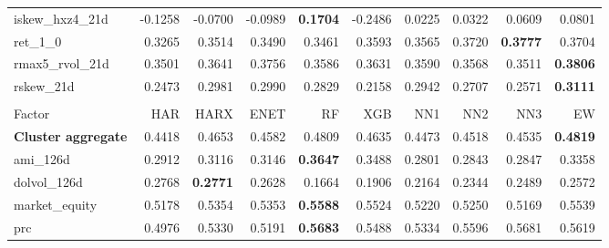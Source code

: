 \begin{longtable}{>{\raggedright\arraybackslash}p{2.6cm}rrrrrrrrr}
iskew\_hxz4\_21d & -0.1258 & \cellcolor{blue!10}-0.0700 & \cellcolor{blue!10}-0.0989 & \textbf{\cellcolor{blue!10}0.1704} & -0.2486 & \cellcolor{blue!10}0.0225 & \cellcolor{blue!10}0.0322 & \cellcolor{blue!10}0.0609 & \cellcolor{blue!10}0.0801 \\
ret\_1\_0 & 0.3265 & \cellcolor{blue!10}0.3514 & \cellcolor{blue!10}0.3490 & \cellcolor{blue!10}0.3461 & \cellcolor{blue!10}0.3593 & \cellcolor{blue!10}0.3565 & \cellcolor{blue!10}0.3720 & \textbf{\cellcolor{blue!10}0.3777} & \cellcolor{blue!10}0.3704 \\
rmax5\_rvol\_21d & 0.3501 & \cellcolor{blue!10}0.3641 & \cellcolor{blue!10}0.3756 & \cellcolor{blue!10}0.3586 & \cellcolor{blue!10}0.3631 & \cellcolor{blue!10}0.3590 & \cellcolor{blue!10}0.3568 & \cellcolor{blue!10}0.3511 & \textbf{\cellcolor{blue!10}0.3806} \\
rskew\_21d & 0.2473 & \cellcolor{blue!10}0.2981 & \cellcolor{blue!10}0.2990 & \cellcolor{blue!10}0.2829 & 0.2158 & \cellcolor{blue!10}0.2942 & \cellcolor{blue!10}0.2707 & \cellcolor{blue!10}0.2571 & \textbf{\cellcolor{blue!10}0.3111} \\
\hline
\multicolumn{10}{@{}l}{\textit{Panel L. Size}} \\
\hline
Factor & HAR & HARX & ENET & RF & XGB & NN1 & NN2 & NN3 & EW \\
\hline
\textbf{Cluster aggregate} & 0.4418 & \cellcolor{blue!10}0.4653 & \cellcolor{blue!10}0.4582 & \cellcolor{blue!10}0.4809 & \cellcolor{blue!10}0.4635 & \cellcolor{blue!10}0.4473 & \cellcolor{blue!10}0.4518 & \cellcolor{blue!10}0.4535 & \textbf{\cellcolor{blue!10}0.4819} \\
ami\_126d & 0.2912 & \cellcolor{blue!10}0.3116 & \cellcolor{blue!10}0.3146 & \textbf{\cellcolor{blue!10}0.3647} & \cellcolor{blue!10}0.3488 & 0.2801 & 0.2843 & 0.2847 & \cellcolor{blue!10}0.3358 \\
dolvol\_126d & 0.2768 & \textbf{\cellcolor{blue!10}0.2771} & 0.2628 & 0.1664 & 0.1906 & 0.2164 & 0.2344 & 0.2489 & 0.2572 \\
market\_equity & 0.5178 & \cellcolor{blue!10}0.5354 & \cellcolor{blue!10}0.5353 & \textbf{\cellcolor{blue!10}0.5588} & \cellcolor{blue!10}0.5524 & \cellcolor{blue!10}0.5220 & \cellcolor{blue!10}0.5250 & 0.5169 & \cellcolor{blue!10}0.5539 \\
prc & 0.4976 & \cellcolor{blue!10}0.5330 & \cellcolor{blue!10}0.5191 & \textbf{\cellcolor{blue!10}0.5683} & \cellcolor{blue!10}0.5488 & \cellcolor{blue!10}0.5334 & \cellcolor{blue!10}0.5596 & \cellcolor{blue!10}0.5681 & \cellcolor{blue!10}0.5619 \\

\end{longtable}
